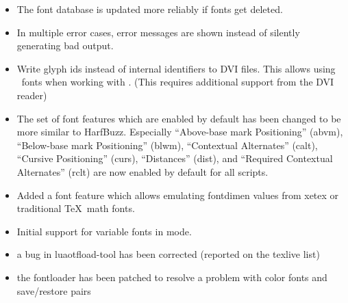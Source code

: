 \begin{itemize}
  \item The font database is updated more reliably if fonts get deleted.
  \item In multiple error cases, error messages are shown instead of silently
    generating bad output.
  \item Write glyph ids instead of internal identifiers to DVI files. This
    allows using \OpenType\ fonts when working with .
    (This requires additional support from the DVI reader)
  \item The set of font features which
    are enabled by default has been changed to be more similar to HarfBuzz.
    Especially \enquote{Above-base mark Positioning} (abvm),
    \enquote{Below-base mark Positioning} (blwm), \enquote{Contextual
      Alternates} (calt), \enquote{Cursive Positioning} (curs),
    \enquote{Distances} (dist), and \enquote{Required Contextual Alternates}
    (rclt) are now enabled by default for all scripts.
  \item Added a  font feature which allows emulating
    fontdimen values from xetex or traditional \TeX\ math fonts.
  \item Initial support for variable fonts in  mode.
\end{itemize}
\endsubsection

\begin{itemize}
\item a bug in luaotfload-tool has been corrected (reported on the texlive list)
\item the fontloader has been patched to resolve a problem with color fonts and save/restore pairs 
\end{itemize}
\endsubsection

